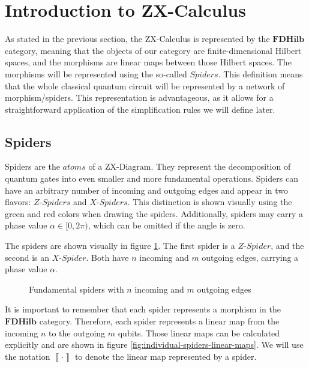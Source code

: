 \section{Introduction to ZX-Calculus}

As stated in the previous section, the ZX-Calculus is represented by the
$\mathbf{FDHilb}$ category, meaning that the objects of our category are finite-dimensional Hilbert spaces, and the morphisms are linear maps between those Hilbert spaces. The morphisms will be represented using the so-called $\textit{Spiders}$. This definition means that the whole classical quantum circuit will be represented by a network of morphism/spiders. This representation is advantageous, as it allows for a straightforward application of the simplification rules we will define later.

\subsection{Spiders}

Spiders are the $\textit{atoms}$ of a ZX-Diagram. They represent the decomposition of quantum gates into even smaller and more fundamental operations.
Spiders can have an arbitrary number of incoming and outgoing edges and appear in two flavors: $\textit{Z-Spiders}$ and $\textit{X-Spiders}$. This distinction is shown visually using the green and red colors when drawing the spiders.
Additionally, spiders may carry a phase value $\alpha \in [0, 2\pi)$, which can be omitted if the angle is zero.

The spiders are shown visually in figure \ref{fig:spiders-visual}. The first spider is a $\textit{Z-Spider}$, and the second is an $\textit{X-Spider}$. Both have $n$ incoming and $m$ outgoing edges, carrying a phase value $\alpha$.

\begin{figure}[h]
    \centering
    \begin{ZX}
          \zxZ{\alpha} 
    \end{ZX}
    \begin{ZX}
          \zxX{\alpha} 
    \end{ZX}
    \caption{Fundamental spiders with $n$ incoming and $m$ outgoing edges}
    \label{fig:spiders-visual}
\end{figure}


It is important to remember that each spider represents a morphism in the $\mathbf{FDHilb}$ category. Therefore, each spider represents a linear map from the incoming $n$ to the outgoing $m$ qubits. Those linear maps can be calculated explicitly and are shown in figure \ref{fig:individual-spiders-linear-maps}. We will use the notation $\left \llbracket \cdot \right \rrbracket$ to denote the linear map represented by a spider.

